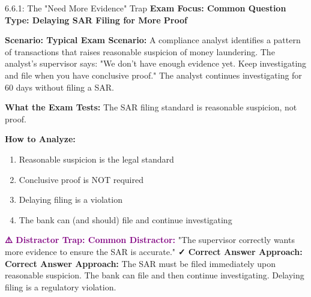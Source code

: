 \documentclass[11pt,a4paper]{beamer}
\newcommand{\examfocus}[1]{\textcolor{orange!80!black}{\textbf{Exam Focus: #1}}}
\newcommand{\trap}[1]{\textcolor{purple}{\textbf{⚠️ Distractor Trap: #1}}}
\newcommand{\correct}[1]{\textcolor{green!50!black}{\textbf{✓ Correct Answer Approach: #1}}}
\newcommand{\scenario}[1]{\textcolor{blue!70!black}{\textbf{Scenario: #1}}}
\begin{document}
	\begin{frame}{6.6.1: The "Need More Evidence" Trap}
		\examfocus{Common Question Type: Delaying SAR Filing for More Proof}
		
		\scenario{Typical Exam Scenario:}
		A compliance analyst identifies a pattern of transactions that raises reasonable suspicion of money laundering. The analyst's supervisor says: "We don't have enough evidence yet. Keep investigating and file when you have conclusive proof." The analyst continues investigating for 60 days without filing a SAR.
		
		\textbf{What the Exam Tests:} The SAR filing standard is reasonable suspicion, not proof.
		
		\textbf{How to Analyze:}
		\begin{enumerate}
			\item Reasonable suspicion is the legal standard
			\item Conclusive proof is NOT required
			\item Delaying filing is a violation
			\item The bank can (and should) file and continue investigating
		\end{enumerate}
		
		\trap{Common Distractor:} "The supervisor correctly wants more evidence to ensure the SAR is accurate."
		\correct{Correct Answer Approach:} The SAR must be filed immediately upon reasonable suspicion. The bank can file and then continue investigating. Delaying filing is a regulatory violation.
	\end{frame}
	
\end{document}
